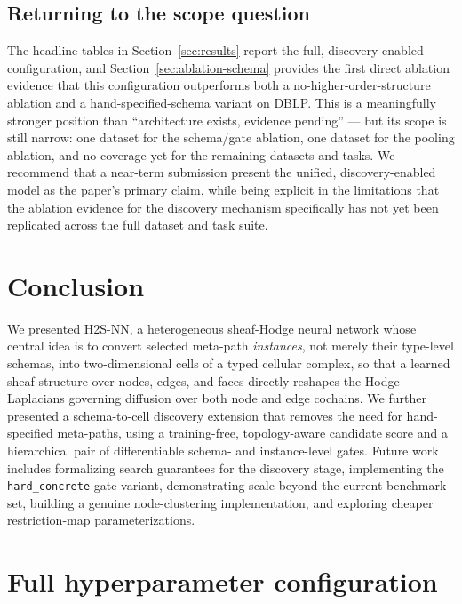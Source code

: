 \documentclass{article}
\begin{document}
\subsection{Returning to the scope question}

The headline tables in Section~\ref{sec:results} report the full, discovery-enabled configuration,
and Section~\ref{sec:ablation-schema} provides the first direct ablation evidence that this
configuration outperforms both a no-higher-order-structure ablation and a hand-specified-schema
variant on DBLP. This is a meaningfully stronger position than ``architecture exists, evidence
pending'' --- but its scope is still narrow: one dataset for the schema/gate ablation, one dataset
for the pooling ablation, and no coverage yet for the remaining datasets and tasks. We recommend
that a near-term submission present the unified, discovery-enabled model as the paper's primary
claim, while being explicit in the limitations that the ablation evidence for the discovery
mechanism specifically has not yet been replicated across the full dataset and task suite.

\section{Conclusion}

We presented H2S-NN, a heterogeneous sheaf-Hodge neural network whose central idea is to convert
selected meta-path \emph{instances}, not merely their type-level schemas, into two-dimensional
cells of a typed cellular complex, so that a learned sheaf structure over nodes, edges, and faces
directly reshapes the Hodge Laplacians governing diffusion over both node and edge cochains. We
further presented a schema-to-cell discovery extension that removes the need for hand-specified
meta-paths, using a training-free, topology-aware candidate score and a hierarchical pair of
differentiable schema- and instance-level gates. Future work includes formalizing search
guarantees for the discovery stage, implementing the \texttt{hard\_concrete} gate variant,
demonstrating scale beyond the current benchmark set, building a genuine node-clustering
implementation, and exploring cheaper restriction-map parameterizations.




\appendix

\section{Full hyperparameter configuration}
\end{document}
